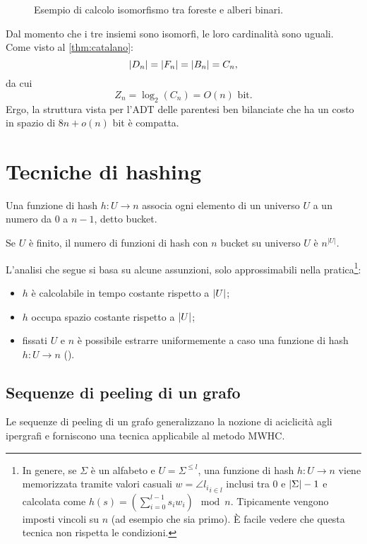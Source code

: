 \begin{figure}[ht]
	\centering
	
	\caption{Esempio di calcolo isomorfismo tra foreste e alberi binari.}
	\label{fig:iso_forest_bintree_example}
\end{figure}

Dal momento che i tre insiemi sono isomorfi, le loro cardinalità sono uguali. Come visto al \cref{thm:catalano}:
\begin{equation*}
	| D_n |=| F_n |=| B_n |=C_n \text,
\end{equation*}
da cui
\begin{equation*}
	Z_n=\log_2(C_n)=O(n) \text{ bit}.
\end{equation*}
Ergo, la struttura vista per l'ADT delle parentesi ben bilanciate che ha un costo in spazio di $8n+o(n)$ bit è compatta.



\section{Tecniche di hashing}
Una funzione di hash $h:U\to n$ associa ogni elemento di un universo $U$ a un numero da $0$ a $n-1$, detto bucket.

Se $U$ è finito, il numero di funzioni di hash con $n$ bucket su universo $U$ è $n^{|U|}$.

L'analisi che segue si basa su alcune assunzioni, solo approssimabili nella pratica\footnote{
	In genere, se $\Sigma$ è un alfabeto e $U=\Sigma^{\leq l}$, una funzione di hash $h: U\to n$ viene memorizzata tramite valori casuali $w=\angle{l_i}_{i\in l}$ inclusi tra $0$ e $| \Sigma |-1$ e calcolata come $h(s)=\left(\sum_{i=0}^{l-1} s_i w_i\right) \mod n$. Tipicamente vengono imposti vincoli su $n$ (ad esempio che sia primo). È facile vedere che questa tecnica non rispetta le condizioni.
}:
\begin{itemize}
	\item $h$ è calcolabile in tempo costante rispetto a $| U |$;
	\item $h$ occupa spazio costante rispetto a $| U |$;
	\item fissati $U$ e $n$ è possibile estrarre uniformemente a caso una funzione di hash $h:U\to n$ ().
\end{itemize}


\subsection{Sequenze di peeling di un grafo}
Le sequenze di peeling di un grafo generalizzano la nozione di aciclicità agli ipergrafi e forniscono una tecnica applicabile al metodo MWHC.

